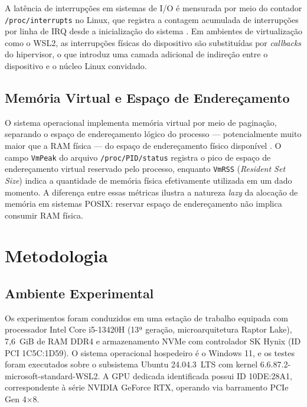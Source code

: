 \documentclass[12pt]{article}
\begin{document}
A latência de interrupções em sistemas de I/O é mensurada por meio do contador \texttt{/proc/interrupts} no Linux, que registra a contagem acumulada de interrupções por linha de IRQ desde a inicialização do sistema \cite{love2010linux}. Em ambientes de virtualização como o WSL2, as interrupções físicas do dispositivo são substituídas por \textit{callbacks} do hipervisor, o que introduz uma camada adicional de indireção entre o dispositivo e o núcleo Linux convidado.

\subsection{Memória Virtual e Espaço de Endereçamento}

O sistema operacional implementa memória virtual por meio de paginação, separando o espaço de endereçamento lógico do processo — potencialmente muito maior que a RAM física — do espaço de endereçamento físico disponível \cite{tanenbaum2015}. O campo \texttt{VmPeak} do arquivo \texttt{/proc/PID/status} registra o pico de espaço de endereçamento virtual reservado pelo processo, enquanto \texttt{VmRSS} (\textit{Resident Set Size}) indica a quantidade de memória física efetivamente utilizada em um dado momento. A diferença entre essas métricas ilustra a natureza \textit{lazy} da alocação de memória em sistemas POSIX: reservar espaço de endereçamento não implica consumir RAM física.

\section{Metodologia}
\label{sec:met}

\subsection{Ambiente Experimental}

Os experimentos foram conduzidos em uma estação de trabalho equipada com processador Intel Core i5-13420H (13ª geração, microarquitetura Raptor Lake), 7,6~GiB de RAM DDR4 e armazenamento NVMe com controlador SK Hynix (ID PCI 1C5C:1D59). O sistema operacional hospedeiro é o Windows 11, e os testes foram executados sobre o subsistema Ubuntu 24.04.3~LTS com kernel 6.6.87.2-microsoft-standard-WSL2. A GPU dedicada identificada possui ID 10DE:28A1, correspondente à série NVIDIA GeForce RTX, operando via barramento PCIe Gen 4×8.
\end{document}
